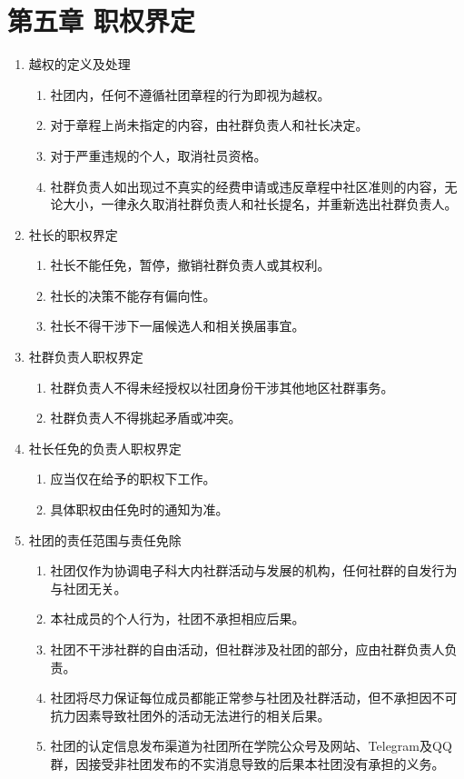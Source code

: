 \documentclass[a4paper]{article}
\newcommand\liststyleWWNumvi{%
\renewcommand\theenumi{\arabic{enumi}}
\renewcommand\theenumii{\arabic{enumi}.\arabic{enumii}}
\renewcommand\theenumiii{\arabic{enumi}.\arabic{enumii}.\arabic{enumiii}}
\renewcommand\theenumiv{\arabic{enumi}.\arabic{enumii}.\arabic{enumiii}.\arabic{enumiv}}
\renewcommand\labelenumi{\theenumi.}
\renewcommand\labelenumii{\theenumii.}
\renewcommand\labelenumiii{\theenumiii.}
\renewcommand\labelenumiv{\theenumiv.}
}
\begin{document}
\section[第五章 职权界定]{第五章 职权界定}
\liststyleWWNumvi
\begin{enumerate}
\item 越权的定义及处理

\begin{enumerate}
\item 社团内，任何不遵循社团章程的行为即视为越权。
\item 对于章程上尚未指定的内容，由社群负责人和社长决定。
\item 对于严重违规的个人，取消社员资格。
\item 社群负责人如出现过不真实的经费申请或违反章程中社区准则的内容，无论大小，一律永久取消社群负责人和社长提名，并重新选出社群负责人。
\end{enumerate}
\item 社长的职权界定

\begin{enumerate}
\item 社长不能任免，暂停，撤销社群负责人或其权利。
\item 社长的决策不能存有偏向性。
\item 社长不得干涉下一届候选人和相关换届事宜。
\end{enumerate}
\item 社群负责人职权界定

\begin{enumerate}
\item 社群负责人不得未经授权以社团身份干涉其他地区社群事务。
\item 社群负责人不得挑起矛盾或冲突。
\end{enumerate}
\item 社长任免的负责人职权界定

\begin{enumerate}
\item 应当仅在给予的职权下工作。
\item 具体职权由任免时的通知为准。
\end{enumerate}
\item 社团的责任范围与责任免除

\begin{enumerate}
\item 社团仅作为协调电子科大内社群活动与发展的机构，任何社群的自发行为与社团无关。
\item 本社成员的个人行为，社团不承担相应后果。
\item 社团不干涉社群的自由活动，但社群涉及社团的部分，应由社群负责人负责。
\item 社团将尽力保证每位成员都能正常参与社团及社群活动，但不承担因不可抗力因素导致社团外的活动无法进行的相关后果。
\item 社团的认定信息发布渠道为社团所在学院公众号及网站、Telegram及QQ群，因接受非社团发布的不实消息导致的后果本社团没有承担的义务。
\end{enumerate}
\end{enumerate}
\end{document}
